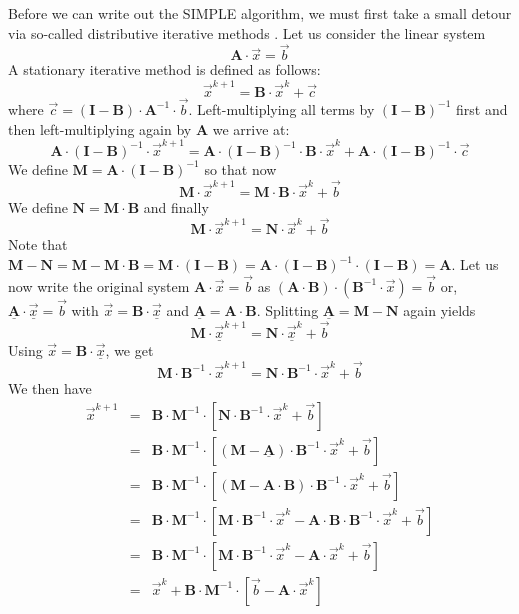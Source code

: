 Before we can write out the SIMPLE algorithm, we must first take a small detour via so-called
distributive iterative methods \cite{vusb00,tack10}. 
Let us consider the linear system 
\[
{\bm A}\cdot \vec{x}=\vec{b}
\] 
A stationary iterative method is defined as follows:
\[
\vec{x}^{k+1}= {\bm B}\cdot \vec{x}^{k}+ \vec{c}
\]
where $\vec{c}=({\bm I}-{\bm B})\cdot {\bm A}^{-1}\cdot \vec{b}$. 
Left-multiplying all terms by $({\bm I}-{\bm B})^{-1}$ first and then left-multiplying again 
by ${\bm A}$  we arrive at:
\[
{\bm A}\cdot ({\bm I}-{\bm B})^{-1}\cdot \vec{x}^{k+1}
={\bm A}\cdot ({\bm I}-{\bm B})^{-1}\cdot {\bm B}\cdot 
\vec{x}^{k} + {\bm A}\cdot ({\bm I}-{\bm B})^{-1} \cdot \vec{c}
\]
We define ${\bm M}={\bm A}\cdot ({\bm I}-{\bm B})^{-1} $ so that now
\[
{\bm M}\cdot\vec{x}^{k+1}={\bm M}\cdot {\bm B}\cdot \vec{x}^{k}+\vec{b} 
\]
We define ${\bm N}={\bm M}\cdot {\bm B}$
and finally 
\[
{\bm M}\cdot\vec{x}^{k+1}={\bm N}\cdot \vec{x}^{k}+\vec{b} 
\]
Note that ${\bm M}-{\bm N}={\bm M}-{\bm M}\cdot {\bm B}
= {\bm M}\cdot  ({\bm I}-{\bm B}) 
= {\bm A}\cdot ({\bm I}-{\bm B})^{-1}\cdot ({\bm I}-{\bm B}) 
= {\bm A}$. 
Let us now write the original system 
${\bm A}\cdot \vec{x}=\vec{b}$ as $({\bm A}\cdot {\bm B})\cdot ({\bm B}^{-1}\cdot \vec{x})=\vec{b}$
or, $ \underline{\bm A}\cdot  \underline{\vec{x}}=\vec{b} $
with 
$\vec{x}={\bm B}\cdot \underline{\vec{x}}$
and 
$\underline{\bm A}={\bm A}\cdot {\bm B}$.
Splitting $\underline{\bm A}={\bm M}-{\bm N}$ again yields 
\[
{\bm M}\cdot \underline{\vec{x}}^{k+1}={\bm N}\cdot \underline{\vec{x}}^{k}+\vec{b} 
\]
Using $\vec{x}={\bm B}\cdot \underline{\vec{x}}$, we get 
\[
{\bm M}\cdot {\bm B}^{-1}\cdot \vec{x}^{k+1} = {\bm N}\cdot {\bm B}^{-1}\cdot  \vec{x}^{k}+\vec{b} 
\]
We then have 
\begin{eqnarray}
\vec{x}^{k+1}
&=&  {\bm B}\cdot {\bm M}^{-1} \cdot[ {\bm N} \cdot  {\bm B}^{-1}  \cdot \vec{x}^{k}+ \vec{b}  ] \\
&=&  {\bm B}\cdot {\bm M}^{-1} \cdot[ ({\bm M} - \underline{\bm A}) \cdot  {\bm B}^{-1}\cdot \vec{x}^{k}+\vec{b}  ]\\
&=&  {\bm B}\cdot {\bm M}^{-1} \cdot[ ({\bm M} - {\bm A}\cdot {\bm B}) \cdot  {\bm B}^{-1}\cdot  \vec{x}^{k}+ \vec{b}  ]\\
&=&  {\bm B}\cdot {\bm M}^{-1} \cdot[ {\bm M}\cdot {\bm B}^{-1} \cdot \vec{x}^{k} - {\bm A}\cdot {\bm B}\cdot  {\bm B}^{-1} \cdot \vec{x}^{k}+\vec{b}  ]\\
&=&  {\bm B}\cdot {\bm M}^{-1} \cdot[ {\bm M}\cdot {\bm B}^{-1} \cdot \vec{x}^{k} - {\bm A}\cdot \vec{x}^{k}+ \vec{b}  ]\\
&=&  \vec{x}^k + {\bm B}\cdot {\bm M}^{-1}\cdot [ \vec{b}    - {\bm A} \cdot \vec{x}^{k}  ]
\end{eqnarray}
